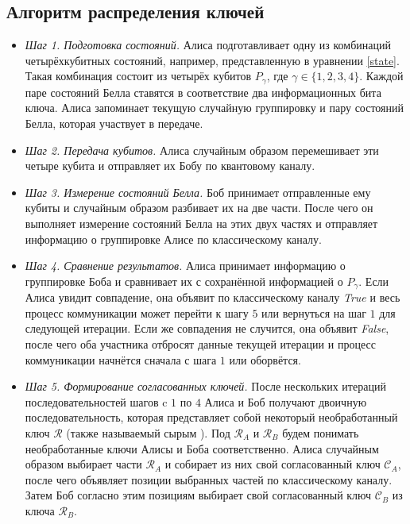 \documentclass[a4paper,11pt]{article}
\begin{document}
\subsection{Алгоритм распределения ключей}

\begin{itemize}

\item \textit{Шаг 1. Подготовка состояний.} Алиса подготавливает одну из комбинаций четырёхкубитных состояний, например, представленную в уравнении \eqref{state}. Такая комбинация состоит из четырёх кубитов $P_\gamma$, где $\gamma \in \{1,2,3,4\}$. Каждой паре состояний Белла ставятся в соответствие два информационных бита ключа. 
Алиса запоминает текущую случайную группировку и пару состояний Белла, которая участвует в передаче. %

\item \textit{Шаг 2. Передача кубитов.} Алиса случайным образом перемешивает эти четыре кубита и отправляет их Бобу по квантовому каналу.

\item \textit{Шаг 3. Измерение состояний Белла.} Боб принимает отправленные ему кубиты и случайным образом разбивает их на две части. После чего он выполняет измерение состояний Белла на этих двух частях и отправляет информацию о группировке Алисе по классическому каналу.

\item \textit{Шаг 4. Сравнение результатов.} Алиса принимает информацию о группировке Боба и сравнивает их с сохранённой информацией о $P_\gamma$. Если Алиса увидит совпадение, она объявит по классическому каналу \textit{True} и весь процесс коммуникации может перейти к шагу $5$ или вернуться на шаг $1$ для следующей итерации. Если же совпадения не случится, она объявит \textit{False}, после чего оба участника отбросят данные текущей итерации и процесс коммуникации начнётся сначала с шага $1$ или оборвётся. 

\item \textit{Шаг 5. Формирование согласованных ключей.} После нескольких итераций последовательностей шагов c $1$ по $4$ Алиса и Боб получают двоичную последовательность, которая представляет собой некоторый необработанный ключ $\mathcal{R}$ (также называемый сырым \cite{vmk}). Под $\mathcal{R}_A$ и $\mathcal{R}_B$ будем понимать необработанные ключи Алисы и Боба соответственно. Алиса случайным образом выбирает части $\mathcal{R}_A$ и собирает из них свой согласованный ключ $\mathcal{C}_A$, после чего объявляет позиции выбранных частей по классическому каналу. Затем Боб согласно этим позициям выбирает свой согласованный ключ $\mathcal{C}_B$ из ключа $\mathcal{R}_B$.


\end{itemize}
\end{document}

